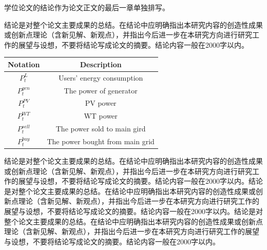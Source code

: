 \documentclass[a4paper, twoside, openany]{NCEPUMaster}
\begin{document}
学位论文的结论作为论文正文的最后一章单独排写。

结论是对整个论文主要成果的总结。在结论中应明确指出本研究内容的创造性成果或创新点理论（含新见解、新观点），并指出今后进一步在本研究方向进行研究工作的展望与设想，不要将结论写成论文的摘要。结论内容一般在2000字以内。

\begin{table}[htbp]
\label{notation} %

\begin{tabularx}{\textwidth}{ C{0.4} C{0.6}}
    \toprule[1.5pt]
        Notation & Description   \\  
    \midrule[1pt]
        $P_{t}^L$ & Users' energy consumption \\ 
        $P_t^{gen}$ & The power of generator\\
        $P_t^{PV}$ & PV power \\ 
        $P_t^{WT}$ & WT power  \\
        $P_t^{sell}$ & The power sold to main gird \\ 
        $P_t^{buy}$ & The power bought from main grid\\
    \bottomrule[1.5pt]
\end{tabularx}
\end{table}

结论是对整个论文主要成果的总结。在结论中应明确指出本研究内容的创造性成果或创新点理论（含新见解、新观点），并指出今后进一步在本研究方向进行研究工作的展望与设想，不要将结论写成论文的摘要。结论内容一般在2000字以内。结论是对整个论文主要成果的总结。在结论中应明确指出本研究内容的创造性成果或创新点理论（含新见解、新观点），并指出今后进一步在本研究方向进行研究工作的展望与设想，不要将结论写成论文的摘要。结论内容一般在2000字以内。结论是对整个论文主要成果的总结。在结论中应明确指出本研究内容的创造性成果或创新点理论（含新见解、新观点），并指出今后进一步在本研究方向进行研究工作的展望与设想，不要将结论写成论文的摘要。结论内容一般在2000字以内。
\end{document}
